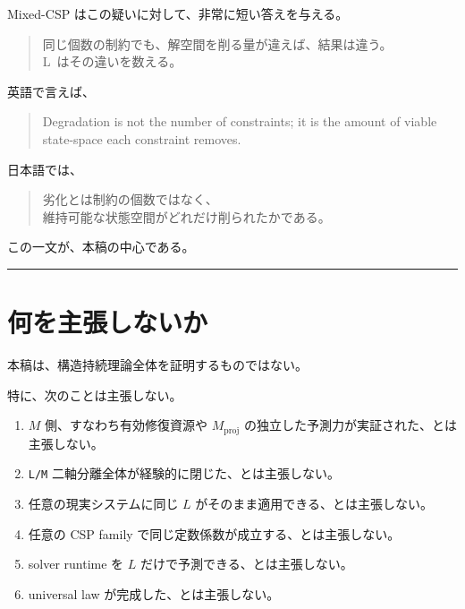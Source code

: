 \documentclass[12pt,a4paper]{article}
\begin{document}
Mixed-CSP はこの疑いに対して、非常に短い答えを与える。

\begin{quote}
{\small\ttfamily\noindent
同じ個数の制約でも、解空間を削る量が違えば、結果は違う。 \\L~はその違いを数える。
}
\end{quote}

英語で言えば、

\begin{quote}
\small
Degradation is not the number of constraints; it is the amount of viable state-space each constraint removes.
\end{quote}

日本語では、

\begin{quote}
{\small\ttfamily\noindent
劣化とは制約の個数ではなく、 \\維持可能な状態空間がどれだけ削られたかである。
}
\end{quote}

この一文が、本稿の中心である。

\begin{center}\rule{0.5\linewidth}{0.5pt}\end{center}

\section{何を主張しないか}\label{ux4f55ux3092ux4e3bux5f35ux3057ux306aux3044ux304b}

本稿は、構造持続理論全体を証明するものではない。

特に、次のことは主張しない。

\begin{enumerate}
\def\labelenumi{\arabic{enumi}.}
\tightlist
\item
  $M$ 側、すなわち有効修復資源や \(M_{\mathrm{proj}}\) の独立した予測力が実証された、とは主張しない。
\item
  \texttt{L/M} 二軸分離全体が経験的に閉じた、とは主張しない。
\item
  任意の現実システムに同じ $L$ がそのまま適用できる、とは主張しない。
\item
  任意の CSP family で同じ定数係数が成立する、とは主張しない。
\item
  solver runtime を $L$ だけで予測できる、とは主張しない。
\item
  universal law が完成した、とは主張しない。
\end{enumerate}
\end{document}
